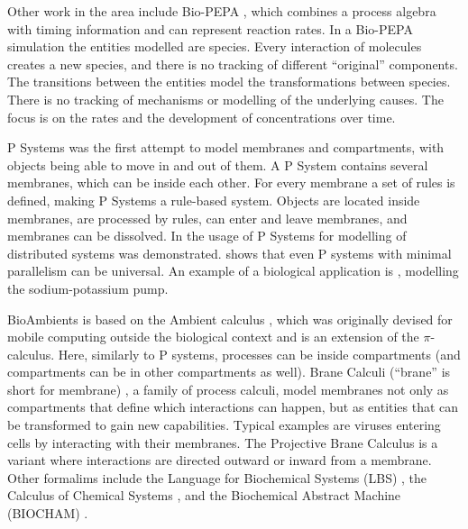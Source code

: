 Other work in the area include Bio-PEPA \cite{CiocchettaBiopepa}, which combines a process algebra with timing information and can represent reaction rates. In a Bio-PEPA simulation the entities modelled are species. Every interaction of molecules creates a new species, and there is no tracking of different ``original'' components. The transitions between the entities model the transformations between species. There is no tracking of mechanisms or modelling of the underlying causes. The focus is on the rates and the development of concentrations over time.  

P Systems \cite{psystems} was the first attempt to model membranes and compartments, with objects being able to move in and out of them. A P System contains several membranes, which can be inside each other. For every membrane a set of rules is defined, making P Systems a rule-based system. Objects are located inside membranes, are processed by rules, can enter and leave membranes, and membranes can be dissolved. In \cite{CIOBANU2003123} the usage of P Systems for modelling of distributed systems was demonstrated. \cite{CIOBANU2007117} shows that even P systems with minimal parallelism can be universal. An example of a biological application is \cite{10.1007/978-3-540-31837-8_12}, modelling the sodium-potassium pump. 

BioAmbients \cite{RegevBioambients} is based on the Ambient calculus \cite{CARDELLI2000177}, which was originally devised for mobile computing outside the biological context and is an extension of the $\pi$-calculus. Here, similarly to P systems, processes can be inside compartments (and compartments can be in other compartments as well). Brane Calculi (``brane'' is short for membrane) \cite{CardelliMobileAmbients}, a family of process calculi, model membranes not only as compartments that define which interactions can happen, but as entities that can be transformed to gain new capabilities. Typical examples are viruses entering cells by interacting with their membranes. The Projective Brane Calculus \cite{ProjectiveBrane} is a variant where interactions are directed outward or inward from a membrane. Other formalims include the Language for Biochemical Systems (LBS) \cite{PlotkinLBS}, the Calculus of Chemical Systems \cite{PlotkinCCS}, and the Biochemical Abstract Machine (BIOCHAM) \cite{biocham}. 

